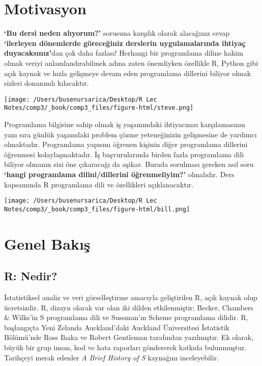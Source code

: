 \documentclass[
]{book}
\begin{document}
\hypertarget{motivasyon}{%
\chapter{Motivasyon}\label{motivasyon}}

\textbf{`Bu dersi neden alıyorum?'} sorusuna karşılık olarak alacağınız cevap \textbf{`ilerleyen dönemlerde göreceğiniz derslerin uygulamalarında ihtiyaç duyacaksınız'}dan çok daha fazlası! Herhangi bir programlama diline hakim olmak veriyi anlamlandırabilmek adına zaten önemliyken özellikle R, Python gibi açık kaynak ve hızla gelişmeye devam eden programlama dillerini biliyor olmak sizleri donanımlı kılacaktır.

\texttt{[image: /Users/busenursarica/Desktop/R Lec Notes/comp3/\_book/comp3\_files/figure-html/steve.png]}

Programlama bilgisine sahip olmak iş yaşamındaki ihtiyacınızı karşılamasının yanı sıra günlük yaşamdaki problem çözme yeteneğinizin gelişmesine de yardımcı olmaktadır. Programlama yapısını öğrenen kişinin diğer programlama dillerini öğrenmesi kolaylaşmaktadır. İş başvurularında birden fazla programlama dili biliyor olmanın sizi öne çıkaracağı da aşikar. Burada sorulması gereken asıl soru \textbf{`hangi programlama dilini/dillerini öğrenmeliyim?'} olmalıdır. Ders kapsamında R programlama dili ve özellikleri açıklanacaktır.

\texttt{[image: /Users/busenursarica/Desktop/R Lec Notes/comp3/\_book/comp3\_files/figure-html/bill.png]}

\hypertarget{genel-bakux131ux15f}{%
\chapter{Genel Bakış}\label{genel-bakux131ux15f}}

\hypertarget{r-nedir}{%
\section{R: Nedir?}\label{r-nedir}}

İstatistiksel analiz ve veri görselleştirme amacıyla geliştirilen R, açık kaynak olup ücretsizdir. R, dizayn olarak var olan iki dilden etkilenmiştir; Becker, Chambers \& Wilks'in S programlama dili ve Sussman'ın Scheme programlama dilidir. R, başlangıçta Yeni Zelanda Auckland'daki Auckland Üniversitesi İstatistik Bölümü'nde Ross Ihaka ve Robert Gentleman tarafından yazılmıştır. Ek olarak, büyük bir grup insan, kod ve hata raporları göndererek katkıda bulunmuştur. Tarihçeyi merak edenler \emph{A Brief History of S} \citep{Becker2004} kaynağını inceleyebilir.
\end{document}
